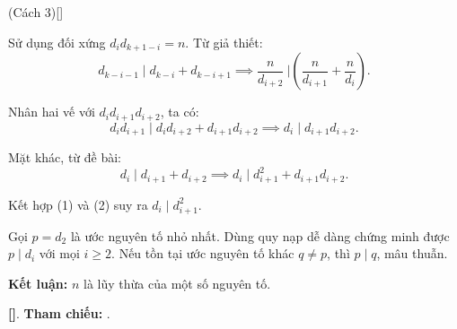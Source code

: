 \documentclass[../2023-n-s.tex]{subfiles}
\begin{document}
\begin{soln}(Cách 3)[\footnotemark]

    Sử dụng đối xứng \( d_i d_{k+1-i} = n \). Từ giả thiết:
    \[
        d_{k-i-1} \mid d_{k-i} + d_{k-i+1} 
        \implies \frac{n}{d_{i+2}} \ \bigg| \left( \frac{n}{d_{i+1}} + \frac{n}{d_i} \right).
    \]

    Nhân hai vế với \( d_i d_{i+1} d_{i+2} \), ta có:
    \[
        d_i d_{i+1} \mid d_i d_{i+2} + d_{i+1} d_{i+2} 
        \implies d_i \mid d_{i+1} d_{i+2}. \tag{1}
    \]

    Mặt khác, từ đề bài:
    \[
        d_i \mid d_{i+1} + d_{i+2} 
        \implies d_i \mid d_{i+1}^2 + d_{i+1} d_{i+2}. \tag{2}
    \]

    Kết hợp (1) và (2) suy ra \( d_i \mid d_{i+1}^2 \).

    Gọi \( p = d_2 \) là ước nguyên tố nhỏ nhất. Dùng quy nạp dễ dàng chứng minh được \( p \mid d_i \) với mọi \( i \ge 2 \).  
    Nếu tồn tại ước nguyên tố khác \( q \ne p \), thì \( p \mid q \), mâu thuẫn.

    \textbf{Kết luận:} \( n \) là lũy thừa của một số nguyên tố.

    \vspace{1em}
    \textbf{[]}.
    \textbf{Tham chiếu:}  .
\end{soln}

\end{document}
